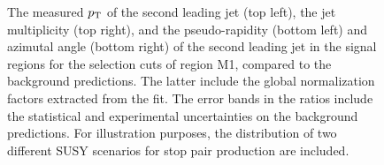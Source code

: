 \begin{figure}[!ht]
\begin{center}
{    }
  \end{center}
  \caption[Kinematic distributions of the $\pt$ of the second leading jet, the jet multiplicity, and the pseudo-rapidity and azimutal angle of the second leading jet in the signal regions for the selection cuts of region M1, after the normalization factors extracted from the fit have been applied.]
{The measured $\pt$ of the second leading jet (top left), the jet multiplicity (top right), and the pseudo-rapidity (bottom left) and azimutal angle (bottom right) of the second leading jet in the signal regions for the selection cuts of region M1, compared to the background predictions. The latter include the global normalization factors extracted from the fit. The error bands in the ratios include the statistical and experimental uncertainties on the background predictions. For illustration purposes, the distribution of two different SUSY scenarios for stop pair production are included.}
  \label{fig:Plot_M1_SR_Jet2}
\end{figure}

